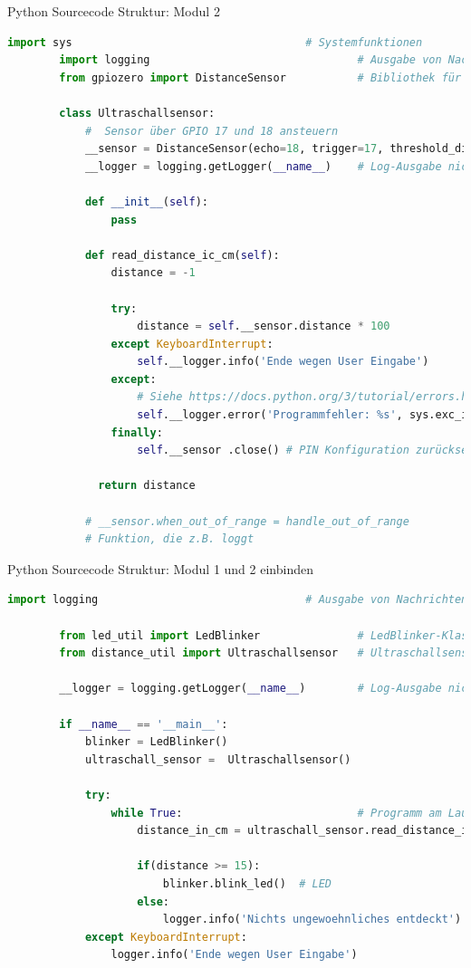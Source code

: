 \begin{frame}[fragile]{Python Sourcecode Struktur: Modul 2}
    \begin{lstlisting}[language=Python, gobble=8]
        import sys                                    # Systemfunktionen
        import logging                                # Ausgabe von Nachrichten+
        from gpiozero import DistanceSensor           # Bibliothek für Ultraschallsensor

        class Ultraschallsensor:
            #  Sensor über GPIO 17 und 18 ansteuern
            __sensor = DistanceSensor(echo=18, trigger=17, threshold_distance = 0.1, max_distance=1)
            __logger = logging.getLogger(__name__)    # Log-Ausgabe nicht mit print()

            def __init__(self):
                pass

            def read_distance_ic_cm(self):
                distance = -1

                try:
                    distance = self.__sensor.distance * 100
                except KeyboardInterrupt:
                    self.__logger.info('Ende wegen User Eingabe')
                except:
                    # Siehe https://docs.python.org/3/tutorial/errors.html
                    self.__logger.error('Programmfehler: %s', sys.exc_info()[0])
                finally:
                    self.__sensor .close() # PIN Konfiguration zurücksetzen

              return distance

            # __sensor.when_out_of_range = handle_out_of_range
            # Funktion, die z.B. loggt
    \end{lstlisting}
\end{frame}

\begin{frame}[fragile]{Python Sourcecode Struktur: Modul 1  und 2 einbinden}
    \begin{lstlisting}[language=Python, gobble=8]
        import logging                                # Ausgabe von Nachrichten

        from led_util import LedBlinker               # LedBlinker-Klasse
        from distance_util import Ultraschallsensor   # Ultraschallsensor-Klasse

        __logger = logging.getLogger(__name__)        # Log-Ausgabe nicht mit print()

        if __name__ == '__main__':
            blinker = LedBlinker()
            ultraschall_sensor =  Ultraschallsensor()

            try:
                while True:                           # Programm am Laufen halten
                    distance_in_cm = ultraschall_sensor.read_distance_in_cm()

                    if(distance >= 15):
                        blinker.blink_led()  # LED
                    else:
                        logger.info('Nichts ungewoehnliches entdeckt')
            except KeyboardInterrupt:
                logger.info('Ende wegen User Eingabe')
    \end{lstlisting}
\end{frame}
